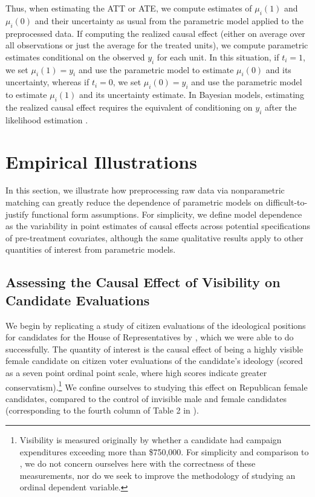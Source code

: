\documentclass[11pt,titlepage]{article}
\begin{document}
Thus, when estimating the ATT or ATE, we compute estimates of
$\mu_i(1)$ and $\mu_i(0)$ and their uncertainty as usual from the
parametric model applied to the preprocessed data.  If computing the
realized causal effect (either on average over all observations or
just the average for the treated units), we compute parametric
estimates conditional on the observed $y_i$ for each unit.  In this
situation, if $t_i=1$, we set $\mu_i(1)=y_i$ and use the parametric
model to estimate $\mu_i(0)$ and its uncertainty, whereas if $t_i=0$,
we set $\mu_i(0)=y_i$ and use the parametric model to estimate
$\mu_i(1)$ and its uncertainty estimate.  In Bayesian models,
estimating the realized causal effect requires the equivalent of
conditioning on $y_i$ after the likelihood estimation \citep[as
in][]{King97}.

\section{Empirical Illustrations}

In this section, we illustrate how preprocessing raw data via
nonparametric matching can greatly reduce the dependence of parametric
models on difficult-to-justify functional form assumptions.  For
simplicity, we define model dependence as the variability in point
estimates of causal effects across potential specifications of
pre-treatment covariates, although the same qualitative results apply
to other quantities of interest from parametric models.

\subsection{Assessing the Causal Effect of Visibility on Candidate
  Evaluations}

We begin by replicating a study of citizen evaluations of the
ideological positions for candidates for the House of Representatives
by \citet{Koch02}, which we were able to do successfully.  The
quantity of interest is the causal effect of being a highly visible
female candidate on citizen voter evaluations of the candidate's
ideology (scored as a seven point ordinal point scale, where high
scores indicate greater conservatism).\footnote{Visibility is measured
  originally by whether a candidate had campaign expenditures
  exceeding more than \$750,000.  For simplicity and comparison to
  \citet{Koch02}, we do not concern ourselves here with the
  correctness of these measurements, nor do we seek to improve the
  methodology of studying an ordinal dependent variable.}  We confine
ourselves to studying this effect on Republican female candidates,
compared to the control of invisible male and female candidates
(corresponding to the fourth column of Table 2 in \citet[p.
459]{Koch02}).
\end{document}
